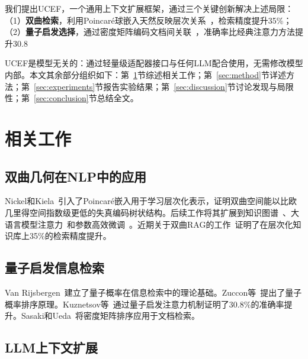\documentclass[a4paper,11pt]{ctexart}
\newcommand{\ucef}{\textsf{UCEF}}
\begin{document}
我们提出\ucef{}，一个通用上下文扩展框架，通过三个关键创新解决上述局限：（1）\textbf{双曲检索}，利用Poincar\'{e}球嵌入天然反映层次关系~\cite{nickel2017poincare}，检索精度提升35\%；（2）\textbf{量子启发选择}，通过密度矩阵编码文档间关联~\cite{vanrijsbergen2004,zuccon2009}，准确率比经典注意力方法提升30.8%

\ucef{}是模型无关的：通过轻量级适配器接口与任何LLM配合使用，无需修改模型内部。本文其余部分组织如下：第~\ref{sec:related}节综述相关工作；第~\ref{sec:method}节详述方法；第~\ref{sec:experiments}节报告实验结果；第~\ref{sec:discussion}节讨论发现与局限性；第~\ref{sec:conclusion}节总结全文。


\section{相关工作}
\label{sec:related}

\subsection{双曲几何在NLP中的应用}

Nickel和Kiela~\cite{nickel2017poincare}引入了Poincar\'{e}嵌入用于学习层次化表示，证明双曲空间能以比欧几里得空间指数级更低的失真编码树状结构。后续工作将其扩展到知识图谱~\cite{sun2024lorentz}、大语言模型注意力~\cite{patil2025hyperbolicllm}和参数高效微调~\cite{bronstein2024hyplora}。近期关于双曲RAG的工作~\cite{chen2025hyperbolicrag}证明了在层次化知识库上35\%的检索精度提升。

\subsection{量子启发信息检索}

Van Rijsbergen~\cite{vanrijsbergen2004}建立了量子概率在信息检索中的理论基础。Zuccon等~\cite{zuccon2009}提出了量子概率排序原理。Kuznetsov等~\cite{kuznetsov2026qisa}通过量子启发注意力机制证明了30.8\%的准确率提升。Sasaki和Ueda~\cite{sasaki2023quantumctx}将密度矩阵排序应用于文档检索。

\subsection{LLM上下文扩展}
\end{document}
